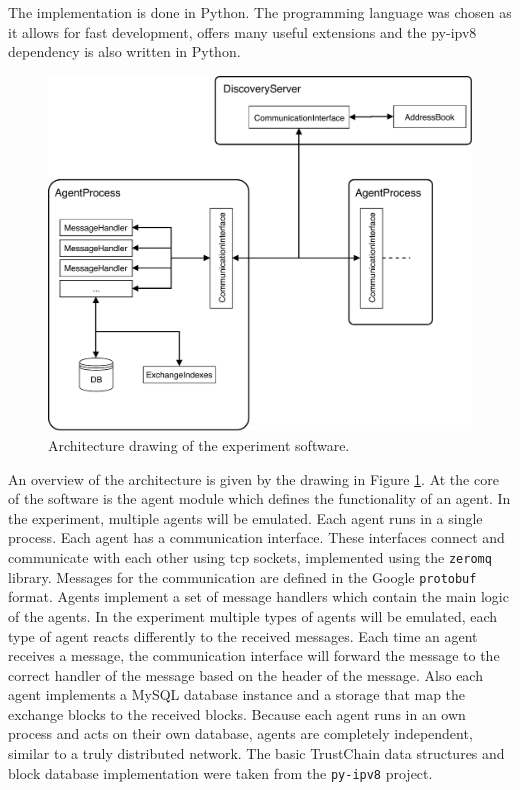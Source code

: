 The implementation is done in Python. The programming language was chosen as it allows for fast development,
offers many useful extensions and the py-ipv8 dependency is also written in Python. 

\begin{figure}[h!]
  \centering
  \includegraphics[width=\textwidth]{images/architecture.pdf}
  \caption{Architecture drawing of the experiment software.}
  \label{fig:software_architecture}
\end{figure}

An overview of the architecture is given by the drawing in Figure \ref{fig:software_architecture}.
At the core of the software is the agent module which defines the functionality of an agent.
In the experiment, multiple agents will be emulated. Each agent runs in a single process. Each agent 
has a communication interface. These interfaces connect and communicate with each other using tcp sockets, 
implemented using the \texttt{zeromq} library. Messages for the communication are defined in the 
Google \texttt{protobuf} format. Agents implement a set of message handlers which contain the main 
logic of the agents. In the experiment multiple types of agents will be emulated, each type of agent
reacts differently to the received messages. Each time an agent receives a message, the communication
interface will forward the message to the correct handler of the message based on the header of the 
message. Also each agent implements a MySQL database instance and a storage that map
the exchange blocks to the received blocks. Because each agent runs in an own process and acts on 
their own database, agents are completely independent, similar to a truly distributed network.
The basic TrustChain data structures and block database implementation were taken from the \texttt{py-ipv8} project. 

